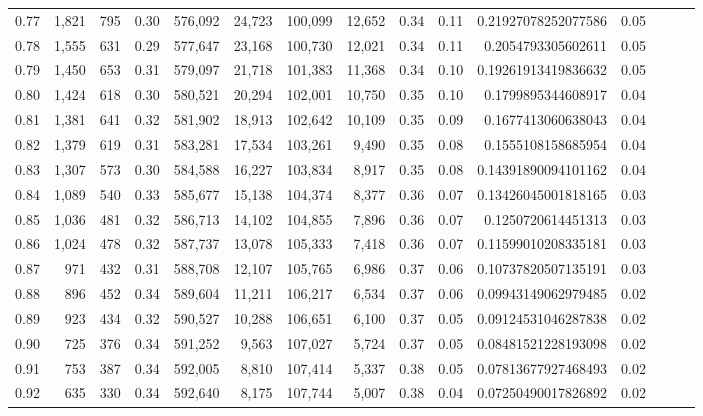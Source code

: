 \begin{tabular}{rrrrrrrrrrrrrrr}
0.77 &   1,821 &    795 &  0.30 &  576,092 &   24,723 &  100,099 &   12,652 &  0.34 &  0.11 &   0.21927078252077586 &      0.05 \\
0.78 &   1,555 &    631 &  0.29 &  577,647 &   23,168 &  100,730 &   12,021 &  0.34 &  0.11 &    0.2054793305602611 &      0.05 \\
0.79 &   1,450 &    653 &  0.31 &  579,097 &   21,718 &  101,383 &   11,368 &  0.34 &  0.10 &   0.19261913419836632 &      0.05 \\
0.80 &   1,424 &    618 &  0.30 &  580,521 &   20,294 &  102,001 &   10,750 &  0.35 &  0.10 &    0.1799895344608917 &      0.04 \\
0.81 &   1,381 &    641 &  0.32 &  581,902 &   18,913 &  102,642 &   10,109 &  0.35 &  0.09 &    0.1677413060638043 &      0.04 \\
0.82 &   1,379 &    619 &  0.31 &  583,281 &   17,534 &  103,261 &    9,490 &  0.35 &  0.08 &    0.1555108158685954 &      0.04 \\
0.83 &   1,307 &    573 &  0.30 &  584,588 &   16,227 &  103,834 &    8,917 &  0.35 &  0.08 &   0.14391890094101162 &      0.04 \\
0.84 &   1,089 &    540 &  0.33 &  585,677 &   15,138 &  104,374 &    8,377 &  0.36 &  0.07 &   0.13426045001818165 &      0.03 \\
0.85 &   1,036 &    481 &  0.32 &  586,713 &   14,102 &  104,855 &    7,896 &  0.36 &  0.07 &    0.1250720614451313 &      0.03 \\
0.86 &   1,024 &    478 &  0.32 &  587,737 &   13,078 &  105,333 &    7,418 &  0.36 &  0.07 &   0.11599010208335181 &      0.03 \\
0.87 &     971 &    432 &  0.31 &  588,708 &   12,107 &  105,765 &    6,986 &  0.37 &  0.06 &   0.10737820507135191 &      0.03 \\
0.88 &     896 &    452 &  0.34 &  589,604 &   11,211 &  106,217 &    6,534 &  0.37 &  0.06 &   0.09943149062979485 &      0.02 \\
0.89 &     923 &    434 &  0.32 &  590,527 &   10,288 &  106,651 &    6,100 &  0.37 &  0.05 &   0.09124531046287838 &      0.02 \\
0.90 &     725 &    376 &  0.34 &  591,252 &    9,563 &  107,027 &    5,724 &  0.37 &  0.05 &   0.08481521228193098 &      0.02 \\
0.91 &     753 &    387 &  0.34 &  592,005 &    8,810 &  107,414 &    5,337 &  0.38 &  0.05 &   0.07813677927468493 &      0.02 \\
0.92 &     635 &    330 &  0.34 &  592,640 &    8,175 &  107,744 &    5,007 &  0.38 &  0.04 &   0.07250490017826892 &      0.02 \\

\end{tabular}
